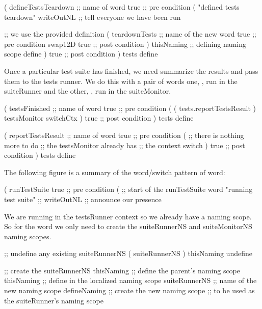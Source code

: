 \startJoylolCode
(
  defineTestsTeardown ;; name of word
  { true }            ;; pre condition
  (
    "defined tests teardown"
    writeOutNL        ;; tell everyone we have been run

                      ;; we use the provided definition
    ( 
      teardownTests   ;; name of the new word
      { true }        ;; pre condition
      swap12D
      { true }        ;; post condition
    )
    thisNaming        ;; defining naming scope
    define
  )
  { true }            ;; post condition
)
tests
define
\stopJoylolCode

Once a particular test suite has finished, we need summarize the results 
and pass them to the tests runner. We do this with a pair of words one, 
, run in the suiteRunner and the other, 
, run in the suiteMonitor. 

\startJoylolCode
(
  testsFinished  ;; name of word
  { true }       ;; pre condition
  (
    ( tests.reportTestsResult )
    testsMonitor
    switchCtx
  )
  { true }       ;; post condition
)
tests
define
\stopJoylolCode

\startJoylolCode
(
  reportTestsResult ;; name of word
  { true }          ;; pre condition
  (
                    ;; there is nothing more to do
                    ;; the testsMonitor already has
                    ;; the context switch 
  )
  { true }          ;; post condition
)
tests
define
\stopJoylolCode

\stopTestSuite


The following figure is a summary of the word/switch pattern of 
 word: 


\startJoylolCode
(
  runTestSuite
  { true }                ;; pre condition
  (                       ;; start of the runTestSuite word
    "running test suite"  ;;
    writeOutNL            ;; announce our presence
\stopJoylolCode

We are running in the testsRunner context so we already have a 
 naming scope. So for the  word we 
only need to create the suiteRunnerNS and suiteMonitorNS naming scopes. 

\startJoylolCode
    ;; undefine any existing suiteRunnerNS
    ( suiteRunnerNS )
    thisNaming
    undefine

    ;; create the suiteRunnerNS
    thisNaming    ;; define the parent's naming scope
    thisNaming    ;; define in the localized naming scope
    suiteRunnerNS ;; name of the new naming scope
    defineNaming  ;; create the new naming scope
                  ;; to be used as the suiteRunner's naming scope
\stopJoylolCode

